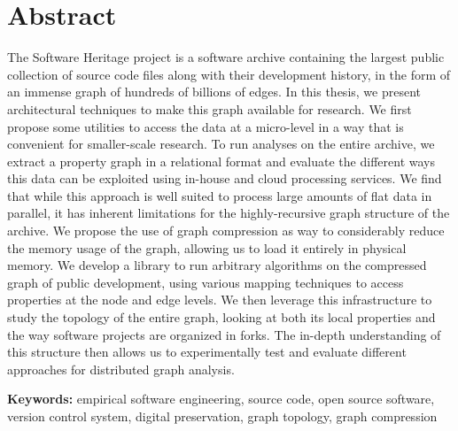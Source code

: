 \begin{minipage}[t][0.5\textheight][t]{0.96\textwidth}

\section*{Abstract}
\begin{SingleSpace}
    The Software Heritage project is a software archive containing the largest
    public collection of source code files along with their development history,
    in the form of an immense graph of hundreds of billions of edges. In this
    thesis, we present architectural techniques to make this graph available
    for research. We first propose some utilities to access the data at a
    micro-level in a way that is convenient for smaller-scale research.
    To run analyses on the entire archive, we extract a property graph in a
    relational format and evaluate the different ways this data can be
    exploited using in-house and cloud processing services.
    We find that while this approach is well suited to process large amounts of
    flat data in parallel, it has inherent limitations for the highly-recursive
    graph structure of the archive. We propose the use of graph compression as
    way to considerably reduce the memory usage of the graph, allowing us to
    load it entirely in physical memory. We develop a library to run arbitrary
    algorithms on the compressed graph of public development, using various
    mapping techniques to access properties at the node and edge levels.
    We then leverage this infrastructure to study the topology of the entire
    graph, looking at both its local properties and the way software projects
    are organized in forks. The in-depth understanding of this structure then
    allows us to experimentally test and evaluate different approaches for
    distributed graph analysis.

\vspace{3mm}

\textbf{Keywords:} empirical software engineering, source code, open source
software, version control system, digital preservation, graph topology, graph
compression

\end{SingleSpace}
\end{minipage} \\


